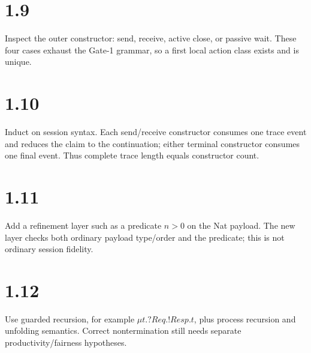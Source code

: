 \section*{1.9}
Inspect the outer constructor: send, receive, active close, or passive wait. These four cases exhaust the Gate-1 grammar, so a first local action class exists and is unique.

\section*{1.10}
Induct on session syntax. Each send/receive constructor consumes one trace event and reduces the claim to the continuation; either terminal constructor consumes one final event. Thus complete trace length equals constructor count.

\section*{1.11}
Add a refinement layer such as a predicate $n>0$ on the Nat payload. The new layer checks both ordinary payload type/order and the predicate; this is not ordinary session fidelity.

\section*{1.12}
Use guarded recursion, for example $\mu t.?Req.!Resp.t$, plus process recursion and unfolding semantics. Correct nontermination still needs separate productivity/fairness hypotheses.
